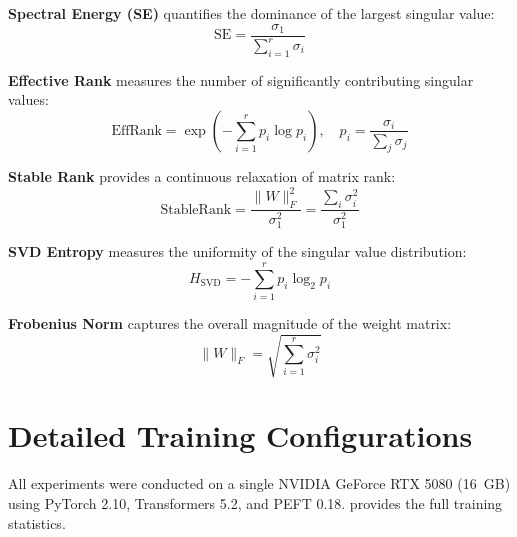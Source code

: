 \documentclass[11pt]{article}
\begin{document}
\textbf{Spectral Energy (SE)} quantifies the dominance of the largest singular value:
\begin{equation}
    \text{SE} = \frac{\sigma_1}{\sum_{i=1}^{r} \sigma_i}
\end{equation}

\textbf{Effective Rank} \cite{roy2007effective} measures the number of significantly contributing singular values:
\begin{equation}
    \text{EffRank} = \exp\left(-\sum_{i=1}^{r} p_i \log p_i\right), \quad p_i = \frac{\sigma_i}{\sum_j \sigma_j}
\end{equation}

\textbf{Stable Rank} provides a continuous relaxation of matrix rank:
\begin{equation}
    \text{StableRank} = \frac{\|W\|_F^2}{\sigma_1^2} = \frac{\sum_i \sigma_i^2}{\sigma_1^2}
\end{equation}

\textbf{SVD Entropy} measures the uniformity of the singular value distribution:
\begin{equation}
    H_{\text{SVD}} = -\sum_{i=1}^{r} p_i \log_2 p_i
\end{equation}

\textbf{Frobenius Norm} captures the overall magnitude of the weight matrix:
\begin{equation}
    \|W\|_F = \sqrt{\sum_{i=1}^{r} \sigma_i^2}
\end{equation}

\section{Detailed Training Configurations}
\label{app:configs}

All experiments were conducted on a single NVIDIA GeForce RTX 5080 (16~GB) using PyTorch 2.10, Transformers 5.2, and PEFT 0.18.  provides the full training statistics.
\end{document}
